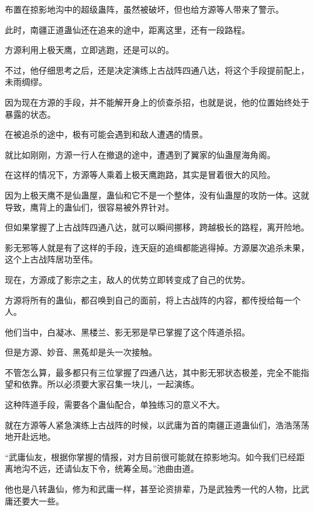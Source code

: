 
\begin{this_body}



布置在掠影地沟中的超级蛊阵，虽然被破坏，但也给方源等人带来了警示。

此时，南疆正道蛊仙还在追来的途中，距离这里，还有一段路程。

方源利用上极天鹰，立即逃跑，还是可以的。

不过，他仔细思考之后，还是决定演练上古战阵四通八达，将这个手段提前配上，未雨绸缪。

因为现在方源的手段，并不能解开身上的侦查杀招，也就是说，他的位置始终处于暴露的状态。

在被追杀的途中，极有可能会遇到和敌人遭遇的情景。

就比如刚刚，方源一行人在撤退的途中，遭遇到了翼家的仙蛊屋海角阁。

在这样的情况下，方源等人乘着上极天鹰跑路，其实是冒着很大的风险。

因为上极天鹰不是仙蛊屋，蛊仙和它不是一个整体，没有仙蛊屋的攻防一体。这就导致，鹰背上的蛊仙们，很容易被外界针对。

但如果掌握了上古战阵四通八达，就可以瞬间挪移，跨越极长的路程，离开险地。

影无邪等人就是有了这样的手段，连天庭的追缉都能逃得掉。方源屡次追杀未果，这个上古战阵居功至伟。

现在，方源成了影宗之主，敌人的优势立即转变成了自己的优势。

方源将所有的蛊仙，都召唤到自己的面前，将上古战阵的内容，都传授给每一个人。

他们当中，白凝冰、黑楼兰、影无邪是早已掌握了这个阵道杀招。

但是方源、妙音、黑菟却是头一次接触。

不管怎么算，最多都只有三位掌握了四通八达，其中影无邪状态极差，完全不能指望和依靠。所以必须要大家召集一块儿，一起演练。

这种阵道手段，需要各个蛊仙配合，单独练习的意义不大。

就在方源等人紧急演练上古战阵的时候，以武庸为首的南疆正道蛊仙们，浩浩荡荡地开赴远地。

“武庸仙友，根据你掌握的情报，对方目前很可能就在掠影地沟。如今我们已经距离地沟不远，还请仙友下令，统筹全局。”池曲由道。

他也是八转蛊仙，修为和武庸一样，甚至论资排辈，乃是武独秀一代的人物，比武庸还要大一些。


\end{this_body}

